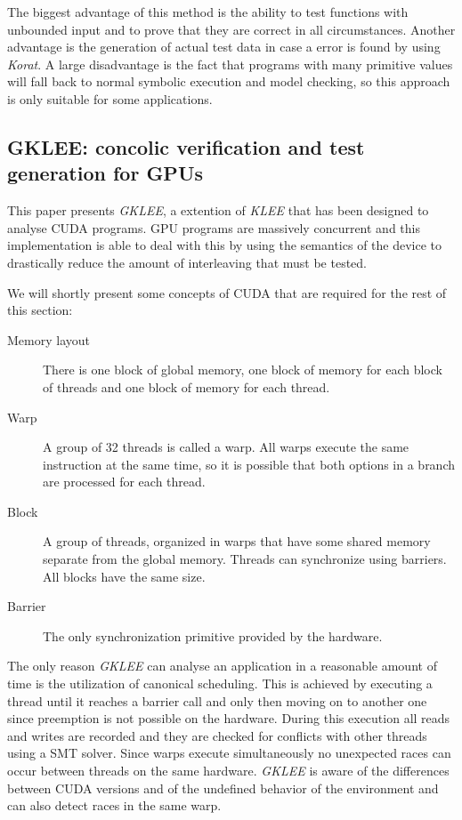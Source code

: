 \documentclass[10pt]{llncs}
\begin{document}
The biggest advantage of this method is the ability to test functions with unbounded input and to prove that they are correct in all circumstances. Another advantage is the generation of actual test data in case a error is found by using \emph{Korat}. A large disadvantage is the fact that programs with many primitive values will fall back to normal symbolic execution and model checking, so this approach is only suitable for some applications.

\subsection{GKLEE: concolic verification and test generation for GPUs \cite{base7}}

This paper presents \emph{GKLEE}, a extention of \emph{KLEE} \cite{klee} that has been designed to analyse CUDA programs. GPU programs are massively concurrent and this implementation is able to deal with this by using the semantics of the device to drastically reduce the amount of interleaving that must be tested.

We will shortly present some concepts of CUDA that are required for the rest of this section:

\begin{description}
	\item[Memory layout] There is one block of global memory, one block of memory for each block of threads and one block of memory for each thread.
	\item[Warp] A group of 32 threads is called a warp. All warps execute the same instruction at the same time, so it is possible that both options in a branch are processed for each thread.
	\item[Block] A group of threads, organized in warps that have some shared memory separate from the global memory. Threads can synchronize using barriers. All blocks have the same size.
	\item[Barrier] The only synchronization primitive provided by the hardware.
\end{description}

The only reason \emph{GKLEE} can analyse an application in a reasonable amount of time is the utilization of canonical scheduling. This is achieved by executing a thread until it reaches a barrier call and only then moving on to another one since preemption is not possible on the hardware. During this execution all reads and writes are recorded and they are checked for conflicts with other threads using a SMT solver. Since warps execute simultaneously no unexpected races can occur between threads on the same hardware. \emph{GKLEE} is aware of the differences between CUDA versions and of the undefined behavior of the environment and can also detect races in the same warp.
\end{document}
